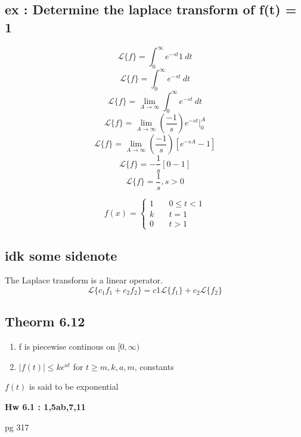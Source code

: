 \documentclass[12pt, letterpaper, twoside]{article}
\begin{document}
\subsection*{ex : Determine the laplace transform of f(t) = 1}
$$ \mathcal{L} \{f\} = \int_0^\infty e^{-st} 1 \ dt $$
$$ \mathcal{L} \{f\} = \int_0^\infty e^{-st} \ dt $$
$$ \mathcal{L} \{f\} = \lim_{A\to\infty} \int_0^\infty e^{-st} \ dt $$
$$ \mathcal{L} \{f\} = \lim_{A\to\infty} (\frac{-1}{s})e^{-st} |_0^A $$
$$ \mathcal{L} \{f\} = \lim_{A\to\infty} (\frac{-1}{s})[e^{-sA}-1] $$
$$ \mathcal{L} \{f\} = -\frac{1}{s}[0-1] $$
$$ \mathcal{L} \{f\} = \frac{1}{s}, s > 0 $$


$$
f(x) = \left\{
        \begin{array}{ll}
            1 & \quad 0 \leq t < 1 \\
            k & \quad t = 1 \\
	    0 & \quad t > 1
        \end{array}
    \right.
$$





\subsection*{idk some sidenote}
The Laplace transform is a linear operator.
$$ \mathcal{L} \{c_1f_1 + c_2f_2\} = c1 \mathcal{L} \{f_1\} + c_2 \mathcal{L} \{f_2\} $$

\subsection*{Theorm 6.12}
\begin{enumerate}
	\item f is piecewise continous on $[0, \infty)$
	\item $|f(t)| \leq ke^{at}$ for $t \geq m, k, a, m$, constants
\end{enumerate}

$f(t)$ is said to be exponential 

\textbf{Hw 6.1 : 1,5ab,7,11}


pg 317
\end{document}
